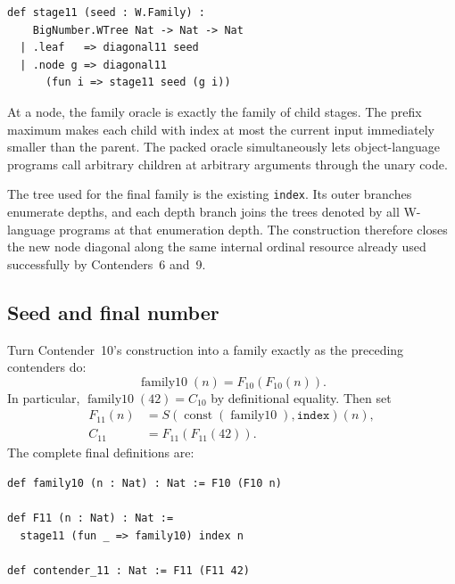 \documentclass[11pt]{article}
\theoremstyle{definition}
\theoremstyle{remark}
\newcommand{\Cten}{\ensuremath{C_{10}}}
\newcommand{\Celeven}{\ensuremath{C_{11}}}
\newcommand{\code}[1]{\texttt{#1}}
\begin{document}
\begin{lstlisting}
def stage11 (seed : W.Family) :
    BigNumber.WTree Nat -> Nat -> Nat
  | .leaf   => diagonal11 seed
  | .node g => diagonal11
      (fun i => stage11 seed (g i))
\end{lstlisting}

At a node, the family oracle is exactly the family of child stages. The prefix
maximum makes each child with index at most the current input immediately
smaller than the parent. The packed oracle simultaneously lets object-language
programs call arbitrary children at arbitrary arguments through the unary code.

The tree used for the final family is the existing \code{index}. Its outer
branches enumerate depths, and each depth branch joins the trees denoted by all
W-language programs at that enumeration depth. The construction therefore
closes the new node diagonal along the same internal ordinal resource already
used successfully by Contenders~6 and~9.

\subsection{Seed and final number}

Turn Contender~10's construction into a family exactly as the preceding
contenders do:
\[
  \operatorname{family10}(n)=F_{10}(F_{10}(n)).
\]
In particular,
$\operatorname{family10}(42)=\Cten$ by definitional equality. Then set
\begin{align}
\label{eq:F11}
  F_{11}(n)&=S(\operatorname{const}(\operatorname{family10}),
                \code{index})(n),\\
\label{eq:C11}
  \Celeven&=F_{11}(F_{11}(42)).
\end{align}
The complete final definitions are:

\begin{lstlisting}
def family10 (n : Nat) : Nat := F10 (F10 n)

def F11 (n : Nat) : Nat :=
  stage11 (fun _ => family10) index n

def contender_11 : Nat := F11 (F11 42)
\end{lstlisting}
\end{document}
